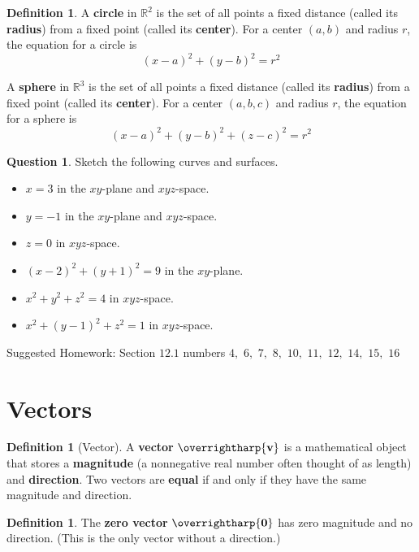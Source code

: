 \documentclass[letterpaper, twoside, 12pt]{book}
\newcommand{\<}{\langle}
\renewcommand{\>}{\rangle}
\theoremstyle{definition}
\theoremstyle{definition}
\newtheorem{definition}[theorem]{Definition}
\newtheorem{question}[theorem]{Question}
\newcommand{\harpvec}[1]{\overrightharp{\ensuremath{\mathbf{#1}}}}
\begin{document}
\begin{definition}
  A \textbf{circle} in $\mathbb{R}^2$ is the set of all points a fixed distance
  (called its \textbf{radius}) from a fixed point (called its \textbf{center}).
  For a center $(a,b)$ and radius $r$, the equation for a circle is
  \[
    (x-a)^2+(y-b)^2=r^2
  \]

  A \textbf{sphere} in $\mathbb{R}^3$ is the set of all points a fixed distance
  (called its \textbf{radius}) from a fixed point (called its \textbf{center}).
  For a center $(a,b,c)$ and radius $r$, the equation for a sphere is
  \[
    (x-a)^2+(y-b)^2+(z-c)^2=r^2
  \]
\end{definition}

\begin{question}
  Sketch the following curves and surfaces.
  \begin{itemize}
    \item $x=3$ in the $xy$-plane and $xyz$-space.
    \item $y=-1$ in the $xy$-plane and $xyz$-space.
    \item $z=0$ in $xyz$-space.
    \item $(x-2)^2+(y+1)^2=9$ in the $xy$-plane.
    \item $x^2+y^2+z^2=4$ in $xyz$-space.
    \item $x^2+(y-1)^2+z^2=1$ in $xyz$-space.
  \end{itemize}
\end{question}

\vfill

\noindent Suggested Homework:
Section $12.1$ numbers $4,$ $6,$ $7,$ $8,$ $10,$ $11,$ $12,$ $14,$ $15,$ $16$

\newpage

\section{Vectors}

\begin{definition}[Vector]
  A \textbf{vector} $\harpvec v$ is a mathematical object that stores a
  \textbf{magnitude} (a nonnegative real number often thought of as length)
  and \textbf{direction}. Two vectors are \textbf{equal} if and only if they
  have the same magnitude and direction.
\end{definition}

\begin{definition}
  The \textbf{zero vector} $\harpvec0$ has zero magnitude and no direction.
  (This is the only vector without a direction.)
\end{definition}
\end{document}
